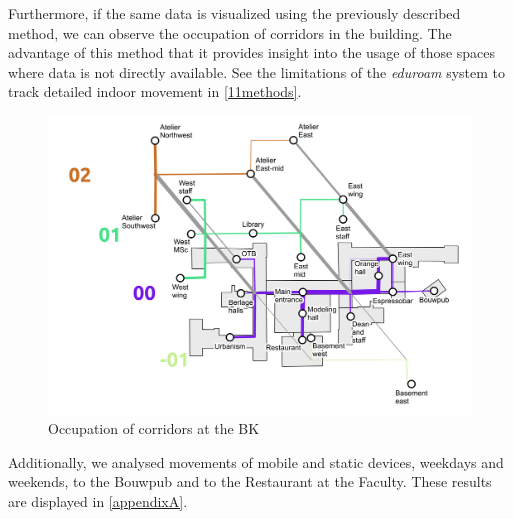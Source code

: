Furthermore, if the same data is visualized using the previously described
method, we can observe the occupation of corridors in the building. The
advantage of this method that it provides insight into the usage of those
spaces where data is not directly available. See the limitations of the
\textit{eduroam} system to track detailed indoor movement in
\autoref{11methods}.

\begin{figure}[H]
\centering
\includegraphics[scale=0.56]{bk_map_total.png}
\captionsetup{justification=centering}
\caption{Occupation of corridors at the BK}
\label{map:bk_total}
\end{figure}

Additionally, we analysed movements of mobile and static devices, weekdays and
weekends, to the Bouwpub and to the Restaurant at the Faculty. These results are
displayed in \autoref{appendixA}.
